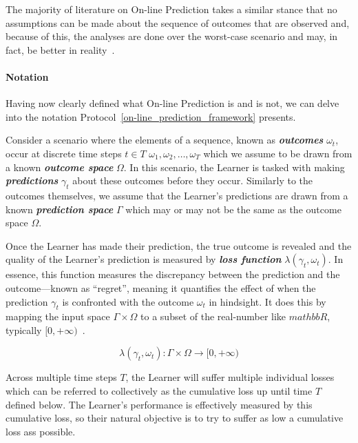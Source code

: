 The majority of literature on On-line Prediction takes a similar stance that no assumptions can be made about the sequence of outcomes that are observed and, because of this, the analyses are done over the worst-case scenario and may, in fact, be better in reality~\cite{cesa-bianchi:1997}.

\paragraph{Notation}\label{paragraph:notation}
Having now clearly defined what On-line Prediction is and is not, we can delve into the notation Protocol~\ref{on-line_prediction_framework} presents.

Consider a scenario where the elements of a sequence, known as \textbf{\textit{outcomes}} $\omega_t$, occur at discrete time steps $t \in T$ $\omega_1, \omega_2, \ldots, \omega_T$ which we assume to be drawn from a known \textbf{\textit{outcome space}} $\Omega$. In this scenario, the Learner is tasked with making \textbf{\textit{predictions}} $\gamma_t$ about these outcomes before they occur. Similarly to the outcomes themselves, we assume that the Learner's predictions are drawn from a known \textbf{\textit{prediction space}} $\Gamma$ which may or may not be the same as the outcome space $\Omega$.

Once the Learner has made their prediction, the true outcome is revealed and the quality of the Learner's prediction is measured by \textbf{\textit{loss function}} $\lambda(\gamma_t, \omega_t)$. In essence, this function measures the discrepancy between the prediction and the outcome—known as ``regret'', meaning it quantifies the effect of when the prediction $\gamma_t$ is confronted with the outcome $\omega_t$ in hindsight. It does this by mapping the input space $\Gamma \times \Omega$ to a subset of the real-number like $mathbb{R}$, typically $[0, +\infty)$~\cite{kalnishkan:2009}.

\begin{equation}
    \lambda(\gamma_t, \omega_t): \Gamma \times \Omega \rightarrow [0, +\infty)
\end{equation}

Across multiple time steps $T$, the Learner will suffer multiple individual losses which can be referred to collectively as the cumulative loss up until time $T$ defined below. The Learner's performance is effectively measured by this cumulative loss, so their natural objective is to try to suffer as low a cumulative loss ass possible.

